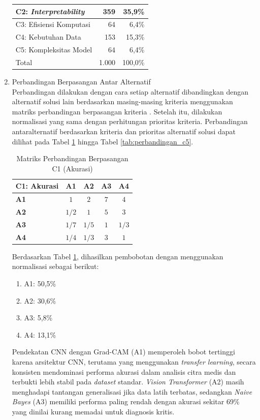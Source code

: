 \begin{enumerate}
\begin{table}[h]
\begin{tabular}{|l|r|r|}
			C2: \textit{Interpretability} & 359 & 35,9\% \\ \hline
			C3: Efisiensi Komputasi & 64 & 6,4\% \\ \hline
			C4: Kebutuhan Data & 153 & 15,3\% \\ \hline
			C5: Kompleksitas Model & 64 & 6,4\% \\ \hline
			Total & 1.000 & 100,0\% \\ \hline
		\end{tabular}
	\end{table}
	\item Perbandingan Berpasangan Antar Alternatif \\
	Perbandingan dilakukan dengan cara setiap alternatif dibandingkan dengan alternatif solusi lain berdasarkan masing-masing kriteria menggunakan matriks perbandingan berpasangan kriteria \textcite{1000minds2025ahp}. Setelah itu, dilakukan normalisasi yang sama dengan perhitungan prioritas kriteria. Perbandingan antaralternatif berdasarkan kriteria dan prioritas alternatif solusi dapat dilihat pada Tabel \ref{tab:perbandingan_c1} hingga Tabel \ref{tab:perbandingan_c5}.
	\begin{table}[H]
		\centering
		\caption{Matriks Perbandingan Berpasangan C1 (Akurasi)}
		\label{tab:perbandingan_c1}
		\begin{tabular}{|l|c|c|c|c|}
			\hline
			\textbf{C1: Akurasi} & \textbf{A1} & \textbf{A2} & \textbf{A3} & \textbf{A4} \\ \hline
			\textbf{A1} & $1$ & $2$ & $7$ & $4$ \\ \hline
			\textbf{A2} & $1/2$ & $1$ & $5$ & $3$ \\ \hline
			\textbf{A3} & $1/7$ & $1/5$ & $1$ & $1/3$ \\ \hline
			\textbf{A4} & $1/4$ & $1/3$ & $3$ & $1$ \\ \hline
		\end{tabular}
	\end{table}
	
	Berdasarkan Tabel \ref{tab:perbandingan_c1}, dihasilkan pembobotan dengan menggunakan normalisasi sebagai berikut:
	\begin{enumerate}
		\item A1: 50,5\%
		\item A2: 30,6\%
		\item A3: 5,8\%
		\item A4: 13,1\%\\
	\end{enumerate}
	
	Pendekatan CNN dengan Grad-CAM (A1) memperoleh bobot tertinggi karena arsitektur CNN, terutama yang menggunakan \textit{transfer learning}, secara konsisten mendominasi performa akurasi dalam analisis citra medis dan terbukti lebih stabil pada \textit{dataset} standar. \textit{Vision Transformer} (A2) masih menghadapi tantangan generalisasi jika data latih terbatas, sedangkan \textit{Naive Bayes} (A3) memiliki performa paling rendah dengan akurasi sekitar 69\% yang dinilai kurang memadai untuk diagnosis kritis.
	

\end{enumerate}
